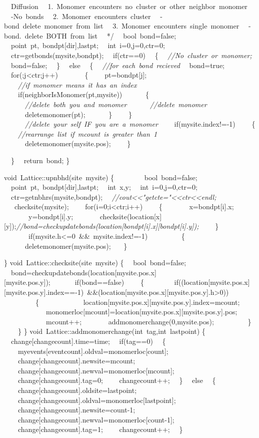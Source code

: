 {{\ \ Diffusion
\ \ 1.\ Monomer\ encounters\ no\ cluster\ or\ other\ neighbor\ monomer
\ \ -{}No\ bonds
\ \ 2.\ Monomer\ encounters\ cluster
\ \ -{}bond\ delete\ monomer\ from\ list
\ \ 3.\ Monomer\ encounters\ single\ monomer
\ \ -{}bond.\ delete\ BOTH\ from\ list
\ \ */}
\ \ bool\ bond=false;
\ \ point\ pt,\ bondpt[dir],lastpt;
\ \ int\ i=0,j=0,ctr=0;
\ \ ctr=getbonds(mysite,bondpt);
\ \ if(ctr==0)
\ \ \{
\ \ \textsl{//No\ cluster\ or\ monomer;}
\ \ bond=false;
\ \ \}
\ \ else
\ \ \{
\ \ \textsl{//for\ each\ bond\ recieved}
\ \ bond=true;
\ \ for(;j<{}ctr;j++)
\ \ \ \ \ \ \ \{
\ \ \ \ pt=bondpt[j];
\ \ \ \ \textsl{//if\ monomer\ means\ it\ has\ an\ index}
\ \ \ \ if(neighborIsMonomer(pt,mysite))
\ \ \ \ \ \ \{
\ \ \ \ \ \ \textsl{//delete\ both\ you\ and\ monomer}
\ \ \ \ \ \ \textsl{//delete\ monomer}
\ \ \ \ \ \ deletemonomer(pt);
\ \ \ \ \ \ \}
\ \ \ \ \}
\ \ \ \ \ \ \textsl{//delete\ your\ self\ IF\ you\ are\ a\ monomer}
\ \ \ \ if(mysite.index!=-{}1)
\ \ \ \ \{
\ \ \ \ \textsl{//rearrange\ list\ if\ mcount\ is\ greater\ than\ 1}
\ \ \ \ \ \ deletemonomer(mysite.pos);
\ \ \ \ \}

\ \ \}
\ \ return\ bond;
\}

void\ Lattice::upnbhd(site\ mysite)
\{
\ \ \ \ \ \ \ \ bool\ bond=false;
\ \ point\ pt,\ bondpt[dir],lastpt;
\ \ int\ x,y;
\ \ int\ i=0,j=0,ctr=0;
\ \ ctr=getnbhrs(mysite,bondpt);
\ \ \textsl{//cout<{}<{}"{}getcte="{}<{}<{}ctr<{}<{}endl;}
\ \ \ checksite(mysite);
\ \ \ \ for(i=0;i<{}ctr;i++)
\ \ \ \ \{
\ \ \ \ \ \ \ x=bondpt[i].x;
\ \ \ \ \ \ \ y=bondpt[i].y;
\ \ \ \ \ \ \ checksite(location[x][y]);\textsl{//bond=checkupdatebonds(location[bondpt[i].x][bondpt[i].y]);}
\ \ \ \ \}
\ \ \ \ \ \ \ if(mysite.h<{}=0\ \&\&\ mysite.index!=-{}1)
\ \ \ \ \ \ \ \ \ \{
\ \ \ \ \ \ deletemonomer(mysite.pos);
\ \ \ \}

\}
void\ Lattice::checksite(site\ mysite)
\{
\ \ bool\ bond=false;
\ \ bond=checkupdatebonds(location[mysite.pos.x][mysite.pos.y]);\ \ \
\ \ \ \ if(bond==false)
\ \ \ \ \{
\ \ \ \ \ \ \ \ if((location[mysite.pos.x][mysite.pos.y].index==-{}1)\ \&\&(location[mysite.pos.x][mysite.pos.y].h>{}0))
\ \ \ \ \ \ \ \ \ \{
\ \ \ \ \ \ \ \ \ \ \ \ location[mysite.pos.x][mysite.pos.y].index=mcount;
\ \ \ \ \ \ \ \ \ \ \ \ monomerloc[mcount]=location[mysite.pos.x][mysite.pos.y].pos;
\ \ \ \ \ \ \ \ \ \ \ \ mcount++;
\ \ \ \ \ \ \ addmonomerchange(0,mysite.pos);
\ \ \ \ \ \ \ \ \ \}
\ \ \ \ \}
\}
void\ Lattice::addmonomerchange(int\ tag,int\ lastpoint)
\{
\ \ change[changecount].time=time;
\ \ if(tag==0)
\ \ \{
\ \ \ \ myevents[eventcount].oldval=monomerloc[count];
\ \ \ \ change[changecount].newsite=mcount;
\ \ \ \ change[changecount].newval=monomerloc[mcount];
\ \ \ \ change[changecount].tag=0;
\ \ \ \ changecount++;
\ \ \}
\ \ else
\ \ \{
\ \ \ \ change[changecount].oldsite=lastpoint;
\ \ \ \ change[changecount].oldval=monomerloc[lastpoint];
\ \ \ \ change[changecount].newsite=count-{}1;
\ \ \ \ change[changecount].newval=monomerloc[count-{}1];
\ \ \ \ change[changecount].tag=1;
\ \ \ \ changecount++;
\ \ \}

}
